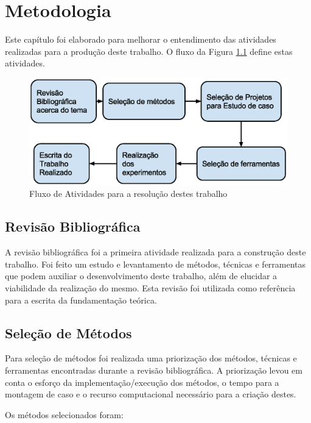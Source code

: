\chapter[Metodologia]{Metodologia}


Este capítulo foi elaborado para melhorar o entendimento das atividades
 realizadas para a produção deste trabalho. O fluxo da Figura 
\ref{fig:fases_metodologia} define estas atividades.

\begin{figure}[h]
    \centering
        \includegraphics[keepaspectratio=true,scale=0.7]{figuras/fases_metodologia.eps}
    \caption{Fluxo de Atividades para a resolução destes trabalho}
    \label{fig:fases_metodologia}
\end{figure}


\section{Revisão Bibliográfica}

A revisão bibliográfica foi a primeira atividade realizada para a construção
 deste trabalho. Foi feito um estudo e levantamento de métodos, técnicas e
 ferramentas que podem auxiliar o desenvolvimento deste trabalho, além de
 elucidar a viabilidade da realização do mesmo. Esta revisão foi utilizada
 como referência para a  escrita da fundamentação teórica.

\section{Seleção de Métodos}

Para seleção de métodos foi realizada uma priorização dos métodos, técnicas e
 ferramentas encontradas durante a revisão bibliográfica. A priorização levou
 em conta o esforço da implementação/execução dos métodos, o tempo para a
 montagem de caso e o recurso computacional necessário para a criação
 destes.

Os métodos selecionados foram:


